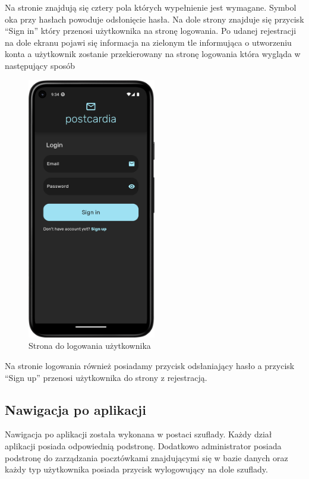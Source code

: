 \documentclass[a4paper,twoside,12pt]{book}
\begin{document}
Na stronie znajdują się cztery pola których wypełnienie jest wymagane. Symbol oka przy hasłach powoduje odsłonięcie hasła. Na dole strony znajduje się przycisk ``Sign in'' który przenosi użytkownika na stronę logowania. 
Po udanej rejestracji na dole ekranu pojawi się informacja na zielonym tle informująca o utworzeniu konta a użytkownik zostanie przekierowany na stronę logowania która wygląda w następujący sposób 

\begin{figure}[H]
    \centering
    \includegraphics[width=0.5\textwidth]{mobile_ss/logowanie.png}
    \caption{Strona do logowania użytkownika}
\end{figure}

Na stronie logowania również posiadamy przycisk odsłaniający hasło a przycisk ``Sign up'' przenosi użytkownika do strony z rejestracją. 

\subsection{Nawigacja po aplikacji}
Nawigacja po aplikacji została wykonana w postaci szuflady. Każdy dział aplikacji posiada odpowiednią podstronę. Dodatkowo administrator posiada podstronę do zarządzania pocztówkami znajdującymi się w bazie danych oraz każdy typ użytkownika posiada przycisk wylogowujący na dole szuflady.
\end{document}
